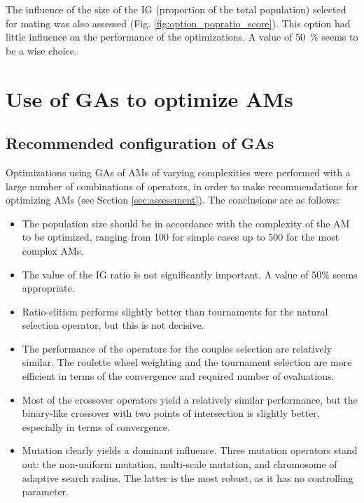\documentclass{ametsoc}
\begin{document}
The influence of the size of the IG (proportion of the total population) selected for mating was also assessed (Fig. \ref{fig:option_popratio_score}). This option had little influence on the performance of the optimizations. A value of 50~\% seems to be a wise choice.


\section{Use of GAs to optimize AMs}
\label{sec:use}

\subsection{Recommended configuration of GAs}
\label{sec:recommendations}

Optimizations using GAs of AMs of varying complexities were performed with a large number of combinations of operators, in order to make recommendations for optimizing AMs (see Section \ref{sec:assessment}). The conclusions are as follows:

\begin{itemize}
	\item The population size should be in accordance with the complexity of the AM to be optimized, ranging from 100 for simple cases up to 500 for the most complex AMs.
	
	\item The value of the IG ratio is not significantly important. A value of 50\% seems appropriate.
	
	\item Ratio-elitism performs slightly better than tournaments for the natural selection operator, but this is not decisive.
	
	\item The performance of the operators for the couples selection are relatively similar. The roulette wheel weighting and the tournament selection are more efficient in terms of the convergence and required number of evaluations.
	
	\item Most of the crossover operators yield a relatively similar performance, but the binary-like crossover with two points of intersection is slightly better, especially in terms of convergence.
	
	\item Mutation clearly yields a dominant influence. Three mutation operators stand out: the non-uniform mutation, multi-scale mutation, and chromosome of adaptive search radius. The latter is the most robust, as it has no controlling parameter.
	
\end{itemize}
\end{document}
